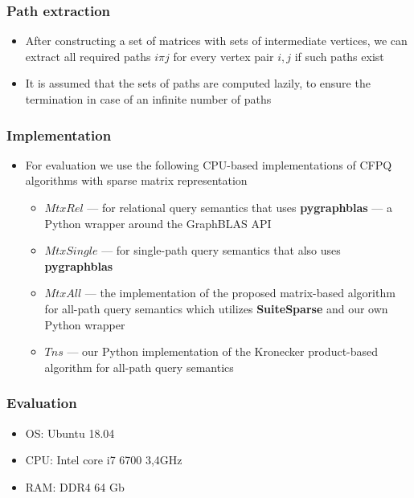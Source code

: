 \documentclass[xcolor=table]{beamer}
\begin{document}
\begin{frame}[fragile] \frametitle{Path extraction}

\begin{itemize}
	\item After constructing a set of matrices with sets of intermediate vertices, we can extract all required paths $i\pi j$ for every vertex pair $i, j$ if such paths exist
	\item It is	assumed that the sets of paths are computed lazily, to ensure the	termination in case of an infinite number of paths
	
\end{itemize}
\end{frame}


\begin{frame}[fragile] \frametitle{Implementation}

\begin{itemize}
	\item For evaluation we use the following CPU-based implementations of CFPQ algorithms with sparse matrix representation
	\begin{itemize}
		\item \textbf{$MtxRel$} --- for  relational query semantics that uses \textbf{pygraphblas} --- a Python wrapper around the GraphBLAS API
		\item \textbf{$MtxSingle$} --- for  single-path query semantics that also uses \textbf{pygraphblas}
		\item \textbf{$MtxAll$} --- the implementation of the proposed matrix-based algorithm for all-path query semantics which utilizes \textbf{SuiteSparse} and our own Python wrapper
		\item \textbf{$Tns$} --- our Python implementation of the Kronecker product-based algorithm for all-path query semantics
		
	\end{itemize}
\end{itemize}
\end{frame}


\begin{frame} \frametitle{Evaluation}
  \begin{itemize}
   \item OS: Ubuntu 18.04
   \item CPU: Intel core i7 6700 3,4GHz
   \item RAM: DDR4 64 Gb
  \end{itemize}
\end{frame}
\end{document}
